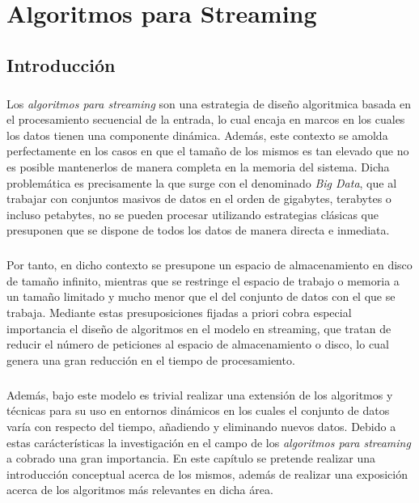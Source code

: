 \documentclass{subfiles}
\begin{document}
  \chapter{Algoritmos para Streaming}
  \label{chap:streaming}


    \section{Introducción}
    \label{sec:streaming_intro}

      \paragraph{}
      Los \emph{algoritmos para streaming} son una estrategia de diseño algoritmica basada en el procesamiento secuencial de la entrada, lo cual encaja en marcos en los cuales los datos tienen una componente dinámica. Además, este contexto se amolda perfectamente en los casos en que el tamaño de los mismos es tan elevado que no es posible mantenerlos de manera completa en la memoria del sistema. Dicha problemática es precisamente la que surge con el denominado \emph{Big Data}, que al trabajar con conjuntos masivos de datos en el orden de gigabytes, terabytes o incluso petabytes, no se pueden procesar utilizando estrategias clásicas que presuponen que se dispone de todos los datos de manera directa e inmediata.

      \paragraph{}
      Por tanto, en dicho contexto se presupone un espacio de almacenamiento en disco de tamaño infinito, mientras que se restringe el espacio de trabajo o memoria a un tamaño limitado y mucho menor que el del conjunto de datos con el que se trabaja. Mediante estas presuposiciones fijadas a priori cobra especial importancia el diseño de algoritmos en el modelo en streaming, que tratan de reducir el número de peticiones al espacio de almacenamiento o disco, lo cual genera una gran reducción en el tiempo de procesamiento.

      \paragraph{}
      Además, bajo este modelo es trivial realizar una extensión de los algoritmos y técnicas para su uso en entornos dinámicos en los cuales el conjunto de datos varía con respecto del tiempo, añadiendo y eliminando nuevos datos. Debido a estas carácterísticas la investigación en el campo de los \emph{algoritmos para streaming} a cobrado una gran importancia. En este capítulo se pretende realizar una introducción conceptual acerca de los mismos, además de realizar una exposición acerca de los algoritmos más relevantes en dicha área.
\end{document}
